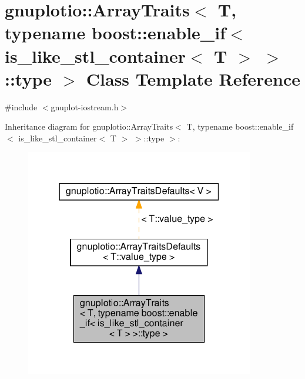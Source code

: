 \hypertarget{classgnuplotio_1_1_array_traits_3_01_t_00_01typename_01boost_1_1enable__if_3_01is__like__stl__co9e1736bbd08cd58c6993ab613a998887}{}\section{gnuplotio\+:\+:Array\+Traits$<$ T, typename boost\+:\+:enable\+\_\+if$<$ is\+\_\+like\+\_\+stl\+\_\+container$<$ T $>$ $>$\+:\+:type $>$ Class Template Reference}
\label{classgnuplotio_1_1_array_traits_3_01_t_00_01typename_01boost_1_1enable__if_3_01is__like__stl__co9e1736bbd08cd58c6993ab613a998887}


{\ttfamily \#include $<$gnuplot-\/iostream.\+h$>$}



Inheritance diagram for gnuplotio\+:\+:Array\+Traits$<$ T, typename boost\+:\+:enable\+\_\+if$<$ is\+\_\+like\+\_\+stl\+\_\+container$<$ T $>$ $>$\+:\+:type $>$\+:
\nopagebreak
\begin{figure}[H]
\begin{center}
\leavevmode
\includegraphics[width=283pt]{classgnuplotio_1_1_array_traits_3_01_t_00_01typename_01boost_1_1enable__if_3_01is__like__stl__co39a918c94e39b553da961d4c081ad747}
\end{center}
\end{figure}


